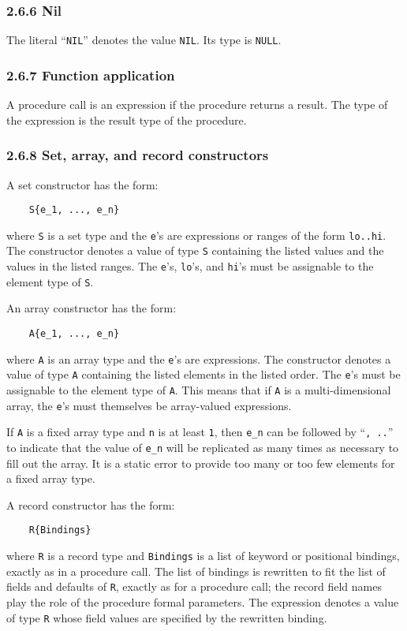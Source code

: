 \documentclass[10pt]{article}
\begin{document}
\subsubsection*{2.6.6 Nil}

The literal ``\verb|NIL|'' denotes the value \verb|NIL|.  Its type is
\verb|NULL|.

\subsubsection*{2.6.7 Function application}

A procedure call is an expression if the procedure returns a result.  The type
of the expression is the result type of the procedure.

\subsubsection*{2.6.8 Set, array, and record constructors}

A set constructor has the form:
\begin{verbatim}
    S{e_1, ..., e_n}
\end{verbatim}
where \verb|S| is a set type and the \verb|e|'s are expressions or ranges of
the form \verb|lo..hi|.  The constructor denotes a value of type \verb|S|
containing the listed values and the values in the listed ranges.  The
\verb|e|'s, \verb|lo|'s, and \verb|hi|'s must be assignable to the element
type of \verb|S|.

An array constructor has the form:
\begin{verbatim}
    A{e_1, ..., e_n}
\end{verbatim}
where \verb|A| is an array type and the \verb|e|'s are expressions.  The
constructor denotes a value of type \verb|A| containing the listed elements in
the listed order.  The \verb|e|'s must be assignable to the element type of
\verb|A|.  This means that if \verb|A| is a multi-dimensional array, the
\verb|e|'s must themselves be array-valued expressions.

If \verb|A| is a fixed array type and \verb|n| is at least \verb|1|, then
\verb|e_n| can be followed by ``\verb|, ..|'' to indicate that the value of
\verb|e_n| will be replicated as many times as necessary to fill out the
array.  It is a static error to provide too many or too few elements for a
fixed array type.

A record constructor has the form:
\begin{verbatim}
    R{Bindings}
\end{verbatim}
where \verb|R| is a record type and \verb|Bindings| is a list of keyword or
positional bindings, exactly as in a procedure call.  The list of bindings is
rewritten to fit the list of fields and defaults of \verb|R|, exactly as for a
procedure call; the record field names play the role of the procedure formal
parameters.  The expression denotes a value of type \verb|R| whose field
values are specified by the rewritten binding.
\end{document}
